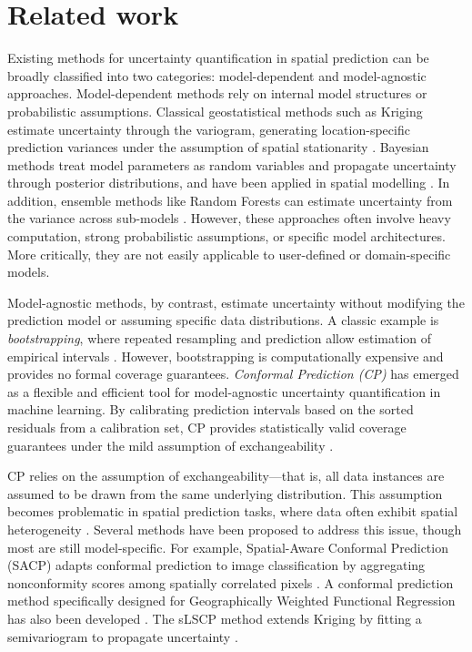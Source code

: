 \documentclass[authoryear,preprint,review,12pt]{elsarticle}
\begin{document}
\section{Related work}

Existing methods for uncertainty quantification in spatial prediction can be broadly classified into two categories: model-dependent and model-agnostic approaches. Model-dependent methods rely on internal model structures or probabilistic assumptions. Classical geostatistical methods such as Kriging estimate uncertainty through the variogram, generating location-specific prediction variances under the assumption of spatial stationarity \citep{lloyd2001assessing}. Bayesian methods treat model parameters as random variables and propagate uncertainty through posterior distributions, and have been applied in spatial modelling \citep{lindgren2015bayesian}. In addition, ensemble methods like Random Forests can estimate uncertainty from the variance across sub-models \citep{mentch2016quantifying}. However, these approaches often involve heavy computation, strong probabilistic assumptions, or specific model architectures. More critically, they are not easily applicable to user-defined or domain-specific models.

Model-agnostic methods, by contrast, estimate uncertainty without modifying the prediction model or assuming specific data distributions. A classic example is \emph{bootstrapping}, where repeated resampling and prediction allow estimation of empirical intervals \citep{zhang2018analysis}. However, bootstrapping is computationally expensive and provides no formal coverage guarantees. \emph{Conformal Prediction (CP)} has emerged as a flexible and efficient tool for model-agnostic uncertainty quantification in machine learning. By calibrating prediction intervals based on the sorted residuals from a calibration set, CP provides statistically valid coverage guarantees under the mild assumption of exchangeability \citep{shafer2008tutorial}.  

CP relies on the assumption of exchangeability—that is, all data instances are assumed to be drawn from the same underlying distribution. This assumption becomes problematic in spatial prediction tasks, where data often exhibit spatial heterogeneity \citep{jiang2024spatial}. Several methods have been proposed to address this issue, though most are still model-specific. For example, Spatial-Aware Conformal Prediction (SACP) adapts conformal prediction to image classification by aggregating nonconformity scores among spatially correlated pixels \citep{liu2024spatial}. A conformal prediction method specifically designed for Geographically Weighted Functional Regression has also been developed \citep{diana2023distribution}. The sLSCP method extends Kriging by fitting a semivariogram to propagate uncertainty \citep{mao2024valid}.
\end{document}
